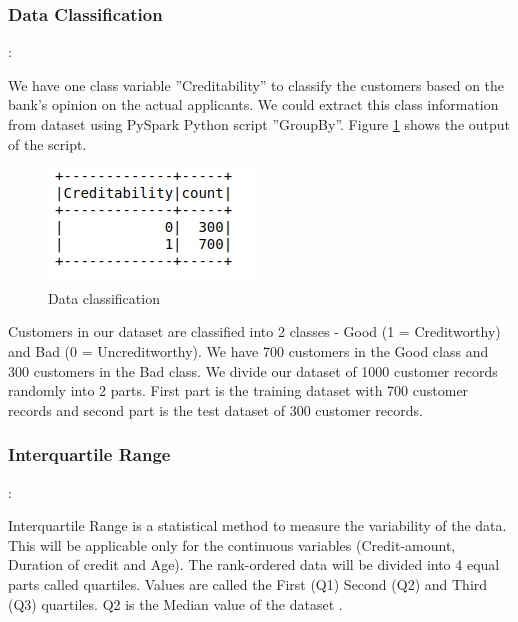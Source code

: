 \documentclass[sigconf]{acmart}
\begin{document}
\subsubsection{Data Classification}\label{Data Classification}:

We have one class variable ''Creditability'' to classify the customers based on the bank's opinion on the actual applicants. We could extract this class information from dataset using PySpark Python script ''GroupBy''. Figure \ref{fig:Figure16} shows the output of the script.

\begin{figure}[htb]
  \centering
  \includegraphics[width=1.0\columnwidth]{images/Figure16.png}
  \caption{Data classification}
  \label{fig:Figure16} 
\end{figure}

Customers in our dataset are classified into 2 classes - Good (1 = Creditworthy) and Bad (0 = Uncreditworthy). We have 700 customers in the Good class and 300 customers in the Bad class. We divide our dataset of 1000 customer records randomly into 2 parts. First part is the training dataset with 700 customer records and second part is the test dataset of 300 customer records.


\subsubsection{Interquartile Range}:

Interquartile Range is a statistical method to measure the variability of the data. This will be applicable only for the continuous variables (Credit-amount, Duration of credit and Age). The rank-ordered data will be divided into 4 equal parts called quartiles. Values are called the First (Q1) Second (Q2) and Third (Q3) quartiles. Q2 is the Median value of the dataset \cite{stat-trek-statistics}.
\end{document}

